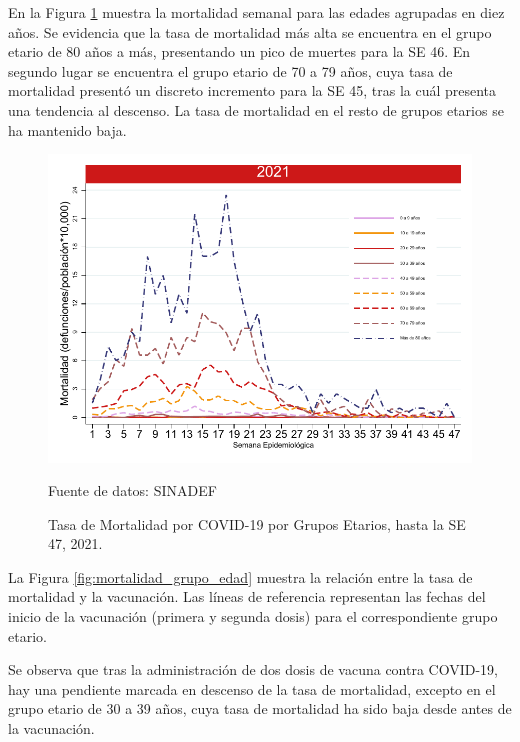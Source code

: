 \documentclass[12pt,a4paper,openany]{book}
\begin{document}
	\noindent En la Figura \ref{fig:mortalidad_edad} muestra la mortalidad semanal para las edades agrupadas en diez años. Se evidencia que la tasa de mortalidad más alta se encuentra en el grupo etario de 80 años a más, presentando un pico de muertes para la SE 46. En segundo lugar se encuentra el grupo etario de 70 a 79 años, cuya tasa de mortalidad presentó un discreto incremento para la SE 45, tras la cuál presenta una tendencia al descenso. La tasa de mortalidad en el resto de grupos etarios se ha mantenido baja.
	
	\begin{figure}[h]
	\caption{Tasa de Mortalidad por COVID-19 por Grupos Etarios, hasta la SE 47, 2021.}\label{fig:mortalidad_edad}
	\begin{center}
		\includegraphics[width=0.65\linewidth]{../figuras/mortalidad_edad.pdf}
	\end{center}
	{\footnotesize Fuente de datos: SINADEF} 
	\end{figure}


	La Figura \ref{fig:mortalidad_grupo_edad} muestra la relación entre la tasa de mortalidad y la vacunación. Las líneas de referencia representan las fechas del inicio de la vacunación (primera y segunda dosis) para el correspondiente grupo etario. 
	
	Se observa que tras la administración de dos dosis de vacuna contra COVID-19,  hay una pendiente marcada en descenso de la tasa de mortalidad, excepto en el grupo etario de 30 a 39 años, cuya tasa de mortalidad ha sido baja desde antes de la vacunación.
\end{document}

